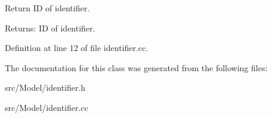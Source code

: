 Return ID of identifier. \begin{Desc}
\item[Returns:]ID of identifier. \end{Desc}


Definition at line 12 of file identifier.cc.

The documentation for this class was generated from the following files:\begin{CompactItemize}
\item 
src/Model/identifier.h\item 
src/Model/identifier.cc\end{CompactItemize}

